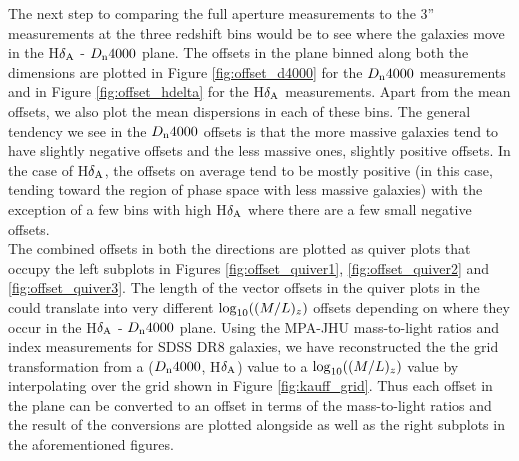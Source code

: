 The next step to comparing the full aperture measurements to the 3'' measurements at the three redshift bins would be to see where the galaxies move in the H$\delta_{\rm A}$ - $D_{\rm n}4000$ plane. The offsets in the plane binned along both the dimensions are plotted in Figure \ref{fig:offset_d4000} for the $D_{\rm n}4000$ measurements and in Figure \ref{fig:offset_hdelta} for the H$\delta_{\rm A}$ measurements. Apart from the mean offsets, we also plot the mean dispersions in each of these bins. The general tendency we see in the $D_{\rm n}4000$ offsets is that the more massive galaxies tend to have slightly negative offsets and the less massive ones, slightly positive offsets. In the case of H$\delta_{\rm A}$, the offsets on average tend to be mostly positive (in this case, tending toward the region of phase space with less massive galaxies) with the exception of a few bins with high H$\delta_{\rm A}$ where there are a few small negative offsets.\\

The combined offsets in both the directions are plotted as quiver plots that occupy the left subplots in Figures \ref{fig:offset_quiver1}, \ref{fig:offset_quiver2} and \ref{fig:offset_quiver3}. The length of the vector offsets in the quiver plots in the could translate into very different ${\rm log}_{10}((M/L)_{z})$ offsets depending on where they occur in the H$\delta_{\rm A}$ - $D_{\rm n}4000$ plane. Using the MPA-JHU mass-to-light ratios and index measurements for SDSS DR8 galaxies, we have reconstructed the the grid transformation from a ($D_{\rm n}4000$, H$\delta_{\rm A}$) value to a ${\rm log}_{10}((M/L)_{z})$ value by interpolating over the grid shown in Figure \ref{fig:kauff_grid}. Thus each offset in the plane can be converted to an offset in terms of the mass-to-light ratios and the result of the conversions are plotted alongside as well as the right subplots in the aforementioned figures.\\

